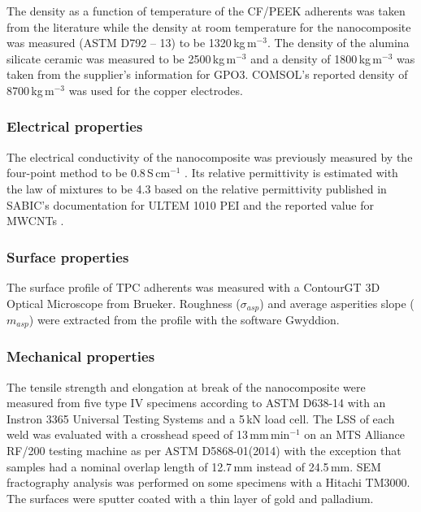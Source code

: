 \documentclass[review,times,sagev,doublespace]{sagej}
\begin{document}
The density as a function of temperature of the CF/PEEK adherents was taken from the literature \cite{Talbot2013} while the density at room temperature for the nanocomposite was measured (ASTM D792 – 13) to be \mbox{1320\,kg\,m$^{-3}$}. 
The density of the alumina silicate ceramic was measured to be \mbox{2500\,kg\,m$^{-3}$} and a density of \mbox{1800\,kg\,m$^{-3}$} was taken from the supplier’s information for GPO3. 
COMSOL’s reported density of \mbox{8700\,kg\,m$^{-3}$} was used for the copper electrodes. 

		\subsubsection{Electrical properties}

The electrical conductivity of the nanocomposite was previously measured by the four-point method to be \mbox{0.8\,S\,cm$^{-1}$} \cite{Brassard2019a}. 
Its relative permittivity is estimated with the law of mixtures to be 4.3 based on the relative permittivity published in SABIC’s documentation for ULTEM 1010 PEI and the reported value for MWCNTs \cite{Katsounaros2011}. 

		\subsubsection{Surface properties}

The surface profile of TPC adherents was measured with a ContourGT 3D Optical Microscope from Brueker. 
Roughness ($\sigma_{asp}$) and average asperities slope ($m_{asp}$) were extracted from the profile with the software Gwyddion.

		\subsubsection{Mechanical properties}

The tensile strength and elongation at break of the nanocomposite were measured from five type IV specimens according to ASTM D638-14 with an Instron 3365 Universal Testing Systems and a \mbox{5\,kN} load cell. 
The {LSS} of each weld was evaluated {with a crosshead speed of 13\,mm\,min$^{-1}$ on} an MTS Alliance RF/200 testing machine as per ASTM D5868-01(2014) with the exception that samples had a nominal overlap length of \mbox{12.7\,mm} instead of \mbox{24.5\,mm}. 
SEM fractography analysis was performed on some specimens with a Hitachi TM3000. 
{
The surfaces were sputter coated with a thin layer of gold and palladium. }
\end{document}

